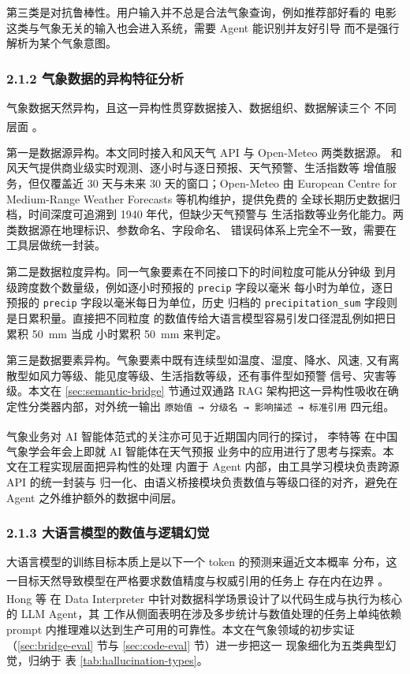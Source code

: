 \documentclass[a4paper]{article}
\theoremstyle{definition}
\theoremstyle{plain}
\theoremstyle{remark}
\newcommand{\reftab}[1]{表 \ref{#1}}
\let\oldcite\cite
\renewcommand{\cite}[1]{\textsuperscript{\oldcite{#1}}}
\newcommand{\bk}{\discretionary{}{}{}}
\begin{document}
第三类是对抗鲁棒性。用户输入并不总是合法气象查询，例如推荐部好看的
电影这类与气象无关的输入也会进入系统，需要 Agent 能识别并友好引导
而不是强行解析为某个气象意图。

\subsubsection*{2.1.2 \quad 气象数据的异构特征分析}

气象数据天然异构，且这一异构性贯穿数据接入、数据组织、数据解读三个
不同层面 \cite{ref25}。

第一是数据源异构。本文同时接入和风天气 API 与 Open-Meteo 两类数据源。
和风天气提供商业级实时观测、逐小时与逐日预报、天气预警、生活指数等
增值服务，但仅覆盖近 30 天与未来 30 天的窗口；Open-Meteo 由 European
Centre for Medium-Range Weather Forecasts 等机构维护，提供免费的
全球长期历史数据归档，时间深度可追溯到 1940 年代，但缺少天气预警与
生活指数等业务化能力。两类数据源在地理标识、参数命名、字段命名、
错误码体系上完全不一致，需要在工具层做统一封装。

第二是数据粒度异构。同一气象要素在不同接口下的时间粒度可能从分钟级
到月级跨度数个数量级，例如逐小时预报的 \texttt{precip} 字段以毫米
每小时为单位，逐日预报的 \texttt{precip} 字段以毫米每日为单位，历史
归档的 \texttt{precipitation\_\bk{}sum} 字段则是日累积量。直接把不同粒度
的数值传给大语言模型容易引发口径混乱例如把日累积 \SI{50}{mm} 当成
小时累积 \SI{50}{mm} 来判定。

第三是数据要素异构。气象要素中既有连续型如温度、湿度、降水、风速,
又有离散型如风力等级、能见度等级、生活指数等级，还有事件型如预警
信号、灾害等级。本文在 \ref{sec:semantic-bridge} 节通过双通路 RAG
架构把这一异构性吸收在确定性分类器内部，对外统一输出 \texttt{原始值
→ 分级名 → 影响描述 → 标准引用} 四元组。

气象业务对 AI 智能体范式的关注亦可见于近期国内同行的探讨，
李特等 \cite{ref2} 在中国气象学会年会上即就 AI 智能体在天气预报
业务中的应用进行了思考与探索。本文在工程实现层面把异构性的处理
内置于 Agent 内部，由工具学习模块负责跨源 API 的统一封装与
归一化、由语义桥接模块负责数值与等级口径的对齐，避免在 Agent
之外维护额外的数据中间层。

\subsubsection*{2.1.3 \quad 大语言模型的数值与逻辑幻觉}

大语言模型的训练目标本质上是以下一个 token 的预测来逼近文本概率
分布，这一目标天然导致模型在严格要求数值精度与权威引用的任务上
存在内在边界 \cite{ref10}。Hong 等 \cite{ref20} 在 Data Interpreter
中针对数据科学场景设计了以代码生成与执行为核心的 LLM Agent，其
工作从侧面表明在涉及多步统计与数值处理的任务上单纯依赖 prompt
内推理难以达到生产可用的可靠性。本文在气象领域的初步实证
（\ref{sec:bridge-eval} 节与 \ref{sec:code-eval} 节）进一步把这一
现象细化为五类典型幻觉，归纳于 \reftab{tab:hallucination-types}。
\end{document}
